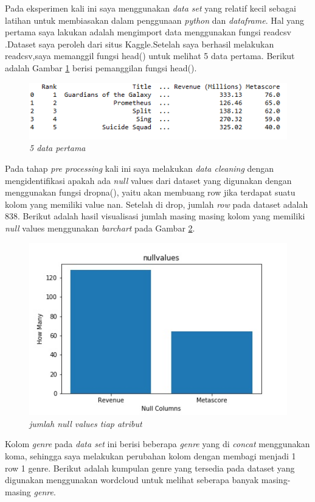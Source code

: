 \documentclass[a4paper,twoside]{article}
\begin{document}
\begin{enumerate}
Pada eksperimen kali ini saya menggunakan\textit{ data set} yang relatif kecil sebagai latihan untuk membiasakan dalam penggunaan \textit{python} dan \textit{dataframe}. Hal yang pertama saya lakukan adalah mengimport data menggunakan fungsi readcsv .Dataset saya peroleh dari situs Kaggle.Setelah saya berhasil melakukan readcsv,saya memanggil fungsi head() untuk melihat 5 data pertama. Berikut adalah Gambar \ref{fig:datasethead} berisi pemanggilan fungsi head().
 		
\begin{figure}[h!]
		\centering  
		\includegraphics{datasethead}   
		\caption{\textit{5 data pertama}}
		\label{fig:datasethead} 
	\end{figure}


Pada tahap \textit{pre processing} kali ini saya melakukan \textit{data cleaning} dengan mengidentifikasi apakah ada \textit{null} values dari dataset yang digunakan dengan menggunakan fungsi dropna(), yaitu akan membuang row jika terdapat suatu kolom yang memiliki value nan. Setelah di drop, jumlah \textit{row} pada dataset adalah 838. Berikut adalah hasil visualisasi jumlah masing masing kolom yang memiliki \textit{null} values menggunakan \textit{barchart} pada Gambar \ref{fig:barchartnullvalues}. 

\begin{figure}[h!]
		\centering  
		\includegraphics[scale=0.7]{barchart-nullvalues}   
		\caption{\textit{jumlah null values tiap atribut}}
		\label{fig:barchartnullvalues} 
\end{figure}
\pagebreak
Kolom \textit{genre} pada \textit{data set} ini berisi beberapa \textit{genre} yang di \textit{concat} menggunakan  koma, sehingga saya melakukan perubahan kolom dengan membagi menjadi 1 row 1 genre. Berikut adalah kumpulan genre yang tersedia pada dataset yang digunakan menggunakan wordcloud untuk melihat seberapa banyak masing-masing \textit{genre}. 


\end{enumerate}
\end{document}
